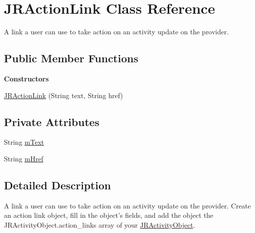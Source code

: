 \hypertarget{classcom_1_1janrain_1_1android_1_1engage_1_1types_1_1_j_r_action_link}{
\section{JRActionLink Class Reference}
\label{classcom_1_1janrain_1_1android_1_1engage_1_1types_1_1_j_r_action_link}
}


A link a user can use to take action on an activity update on the provider.  


\subsection*{Public Member Functions}
\begin{Indent}{\bf Constructors}\par
{\em \label{_amgrp559a25fdb98a7d1fd1c3771ac568d5e9}
 }\begin{DoxyCompactItemize}
\item 
\hyperlink{classcom_1_1janrain_1_1android_1_1engage_1_1types_1_1_j_r_action_link_aa550387930016cdfada35d59aadf892f}{JRActionLink} (String text, String href)
\end{DoxyCompactItemize}
\end{Indent}
\subsection*{Private Attributes}
\begin{DoxyCompactItemize}
\item 
String \hyperlink{classcom_1_1janrain_1_1android_1_1engage_1_1types_1_1_j_r_action_link_ad286627be2e2470bd7f917c103faecbf}{mText}
\item 
String \hyperlink{classcom_1_1janrain_1_1android_1_1engage_1_1types_1_1_j_r_action_link_a9207c3b8ef8469f1d9101379d48550ce}{mHref}
\end{DoxyCompactItemize}


\subsection{Detailed Description}
A link a user can use to take action on an activity update on the provider. Create an action link object, fill in the object's fields, and add the object the JRActivityObject.action\_\-links array of your \hyperlink{classcom_1_1janrain_1_1android_1_1engage_1_1types_1_1_j_r_activity_object}{JRActivityObject}.

